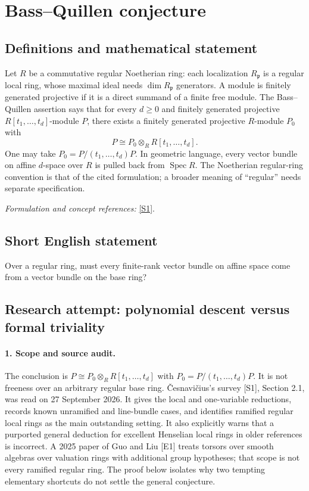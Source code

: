 \documentclass[11pt]{article}
\begin{document}
\section*{\texorpdfstring{Bass–Quillen conjecture}{Bass–Quillen conjecture}}\label{7200003}
\subsection{Definitions and mathematical statement}
Let $R$ be a commutative regular Noetherian ring: each localization $R_{\mathfrak p}$ is a regular local ring, whose maximal ideal needs $\dim R_{\mathfrak p}$ generators. A module is finitely generated projective if it is a direct summand of a finite free module. The Bass--Quillen assertion says that for every $d\ge0$ and finitely generated projective $R[t_1,\ldots,t_d]$-module $P$, there exists a finitely generated projective $R$-module $P_0$ with
\[
 P\cong P_0\otimes_R R[t_1,\ldots,t_d].
\]
One may take $P_0=P/(t_1,\ldots,t_d)P$. In geometric language, every vector bundle on affine $d$-space over $R$ is pulled back from $\operatorname{Spec}R$. The Noetherian regular-ring convention is that of the cited formulation; a broader meaning of ``regular'' needs separate specification.
\par\smallskip\textit{Formulation and concept references:} \href{https://arxiv.org/html/2201.06424v4}{[S1]}.

\subsection{Short English statement}
Over a regular ring, must every finite-rank vector bundle on affine space come from a vector bundle on the base ring?
\subsection{Research attempt: polynomial descent versus formal triviality}
\paragraph{1. Scope and source audit.}
The conclusion is $P\cong P_0\otimes_R R[t_1,\ldots,t_d]$ with $P_0=P/(t_1,\ldots,t_d)P$. It is not freeness over an arbitrary regular base ring. \v{C}esnavi\v{c}ius's survey [S1], Section 2.1, was read on 27 September 2026. It gives the local and one-variable reductions, records known unramified and line-bundle cases, and identifies ramified regular local rings as the main outstanding setting. It also explicitly warns that a purported general deduction for excellent Henselian local rings in older references is incorrect. A 2025 paper of Guo and Liu [E1] treats torsors over smooth algebras over valuation rings with additional group hypotheses; that scope is not every ramified regular ring. The proof below isolates why two tempting elementary shortcuts do not settle the general conjecture.
\end{document}

